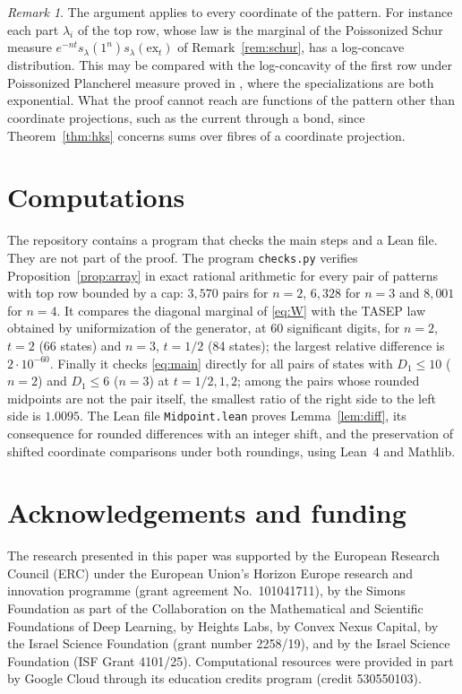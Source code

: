 \documentclass[11pt]{amsart}
\theoremstyle{remark}
\newtheorem{remark}[theorem]{Remark}
\numberwithin{equation}{section}
\newcommand{\1}{\mathbf 1}
\begin{document}
\begin{remark}
The argument applies to every coordinate of the pattern. For instance each part $\lambda_i$ of the top row, whose law is the marginal of the Poissonized Schur measure $e^{-nt}s_\lambda(1^n)s_\lambda(\mathrm{ex}_t)$ of Remark~\ref{rem:schur}, has a log-concave distribution. This may be compared with the log-concavity of the first row under Poissonized Plancherel measure proved in \cite{BKM}, where the specializations are both exponential. What the proof cannot reach are functions of the pattern other than coordinate projections, such as the current through a bond, since Theorem~\ref{thm:hks} concerns sums over fibres of a coordinate projection.
\end{remark}

\section{Computations}\label{sec:numerics}

The repository \cite{code} contains a program that checks the main steps and a Lean file. They are not part of the proof. The program \texttt{checks.py} verifies Proposition~\ref{prop:array} in exact rational arithmetic for every pair of patterns with top row bounded by a cap: $3{,}570$ pairs for $n=2$, $6{,}328$ for $n=3$ and $8{,}001$ for $n=4$. It compares the diagonal marginal of \eqref{eq:W} with the TASEP law obtained by uniformization of the generator, at $60$ significant digits, for $n=2$, $t=2$ (66 states) and $n=3$, $t=1/2$ (84 states); the largest relative difference is $2\cdot10^{-60}$. Finally it checks \eqref{eq:main} directly for all pairs of states with $D_1\le10$ ($n=2$) and $D_1\le6$ ($n=3$) at $t=1/2,1,2$; among the pairs whose rounded midpoints are not the pair itself, the smallest ratio of the right side to the left side is $1.0095$. The Lean file \texttt{Midpoint.lean} proves Lemma~\ref{lem:diff}, its consequence for rounded differences with an integer shift, and the preservation of shifted coordinate comparisons under both roundings, using Lean~4 and Mathlib.

\section*{Acknowledgements and funding}
The research presented in this paper was supported by the European Research
Council (ERC) under the European Union's Horizon Europe research and
innovation programme (grant agreement No.~101041711), by the Simons
Foundation as part of the Collaboration on the Mathematical and Scientific
Foundations of Deep Learning, by Heights Labs, by Convex Nexus Capital, by
the Israel Science Foundation (grant number 2258/19), and by the Israel
Science Foundation (ISF Grant 4101/25). Computational resources were
provided in part by Google Cloud through its education credits program
(credit 530550103).
\end{document}
